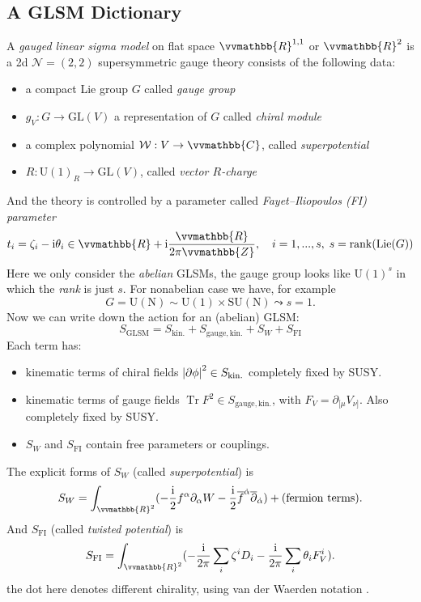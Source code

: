 \documentclass{article}
\newcommand{\ii}{\mathrm{i}}
\begin{document}
\subsection{A GLSM Dictionary}
A \textit{gauged linear sigma model} on flat space $\vvmathbb{R}^{1,1}$ or $\vvmathbb{R}^{2}$ is a 2d $\mathcal{N}=(2,2)$ supersymmetric gauge theory consists of the following data:
\begin{itemize}
    \item a compact Lie group $G$ called \textit{gauge group}
    \item $g_V:G\to\mathrm{GL}(V)$ a representation of $G$ called \textit{chiral module}
    \item a complex polynomial $\mathcal{W}:V\to \vvmathbb{C}$, called \textit{superpotential}
    \item $R:\mathrm{U}(1)_R\to\mathrm{GL}(V)$, called \textit{vector $R$-charge}
\end{itemize}
And the theory is controlled by a parameter called \textit{Fayet–Iliopoulos (FI) parameter}
\begin{equation*}
    t_i=\zeta_i-\ii\theta_i\in\vvmathbb{R}+\ii \frac{\vvmathbb{R}}{2\pi\vvmathbb{Z}},\quad i=1,...,s,\;s=\mathrm{rank}(\mathrm{Lie}(G))
\end{equation*}
Here we only consider the \textit{abelian} GLSMs, the gauge group looks like $\mathrm{U}(1)^s$ in which the \textit{rank} is just $s$. For nonabelian case we have, for example
\begin{equation*}
    G=\mathrm{U(N)\sim \mathrm{U}(1)\times\mathrm{SU}(N)}\leadsto s=1.
\end{equation*}
Now we can write down the action for an (abelian) GLSM:
\begin{equation}
    S_{\mathrm{GLSM}}=S_{\mathrm{kin.}}+S_{\mathrm{gauge,kin.}}+S_{W}+S_{\mathrm{FI}}
\end{equation}
Each term has:
\begin{itemize}
    \item kinematic terms of chiral fields $\abs{\partial\phi}^2 \in S_{\mathrm{kin.}}$ completely fixed by SUSY.
    \item kinematic terms of gauge fields $\operatorname{Tr}{F}^2 \in S_{\mathrm{gauge,kin.}}$, with $F_V=\partial_{[\mu}V_{\nu]}$. Also completely fixed by SUSY.
    \item $S_{W}$ and $S_{\mathrm{FI}}$ contain free parameters or couplings.
\end{itemize}
The explicit forms of $S_W$ (called \textit{superpotential}) is 
\begin{equation}
    S_W=\int_{\vvmathbb{R}^2}(-\frac{\ii}{2}f^{\alpha}\partial_{\alpha}W-\frac{\ii}{2}\overline{f}^{\Dot{\alpha}}\overline{\partial}_{\Dot{\alpha}})+\text{(fermion\ terms)}.
\end{equation}
And $S_{\mathrm{FI}}$ (called \textit{twisted potential}) is
\begin{equation}
    S_{\mathrm{FI}}=\int_{\vvmathbb{R}^2}(-\frac{\ii}{2\pi}\sum_{i}\zeta^{i}D_i-\frac{\ii}{2\pi}\sum_{i}\theta_i F_V^i).
\end{equation}
the dot here denotes different chirality, using van der Waerden notation \cite{Wess:1992cp}.
\end{document}

